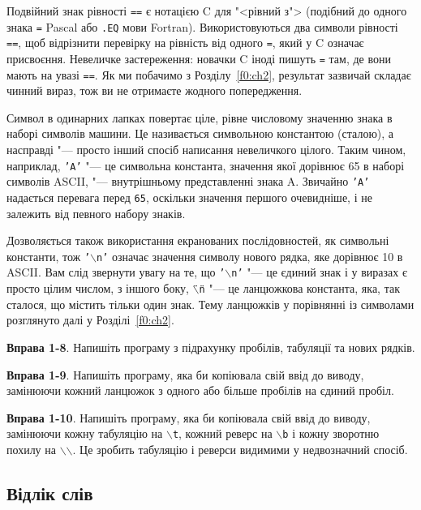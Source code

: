 \documentclass[a4paper,12pt]{book}
\begin{document}
  Подвійний знак рівності \texttt{==} є нотацією C для "<рівний з"> (подібний до одного
  знака \texttt{=} Pascal або \texttt{.EQ} мови Fortran). Використовуються два символи
  рівності \texttt{==}, щоб відрізнити перевірку на рівність від одного \texttt{=}, який у
  C означає присвоєння. Невеличке застереження: новачки C іноді пишуть \texttt{=} там, де
  вони мають на увазі \texttt{==}. Як ми побачимо з Розділу~\ref{f0:ch2},
  результат зазвичай складає чинний вираз, тож ви не отримаєте жодного попередження.

  Символ в одинарних лапках повертає ціле, рівне числовому значенню знака в наборі
  символів машини. Це називається символьною константою (сталою), а насправді "---
  просто інший спосіб написання невеличкого цілого. Таким чином, наприклад, \texttt{'A'}
  "--- це символьна константа, значення якої дорівнює 65 в наборі символів ASCII,
  "--- внутрішньому представленні знака A. Звичайно \texttt{'A'} надається перевага
  перед \texttt{65}, оскільки значення першого очевидніше, і не залежить від певного
  набору знаків.

  Дозволяється також використання екранованих послідовностей, як символьні константи, тож
  \texttt{'\mbox{$\backslash$}n'} означає значення символу нового рядка, яке дорівнює 10 в
  ASCII. Вам слід звернути увагу на те, що \texttt{'\mbox{$\backslash$}n'} "--- це єдиний
  знак і у виразах є просто цілим числом, з іншого боку,
  \texttt{\"{}\mbox{$\backslash$}n\"{}} "--- це ланцюжкова константа, яка, так сталося, що
  містить тільки один знак. Тему ланцюжків у порівнянні із символами розглянуто далі у
  Розділі~\ref{f0:ch2}.

  \textbf{Вправа 1-8}. Напишіть програму з підрахунку пробілів, табуляції та нових рядків.

  \textbf{Вправа 1-9}. Напишіть програму, яка би копіювала свій ввід до виводу, замінюючи
  кожний ланцюжок з одного або більше пробілів на єдиний пробіл.

  \textbf{Вправа 1-10}. Напишіть програму, яка би копіювала свій ввід до виводу, замінюючи
  кожну табуляцію на \texttt{\mbox{$\backslash$}t}, кожний реверс на
  \texttt{\mbox{$\backslash$}b} і кожну зворотню похилу на
  \texttt{\mbox{$\backslash$}\mbox{$\backslash$}}. Це зробить табуляцію і реверси видимими
  у недвозначний спосіб.

\subsection{Відлік слів}
\end{document}
